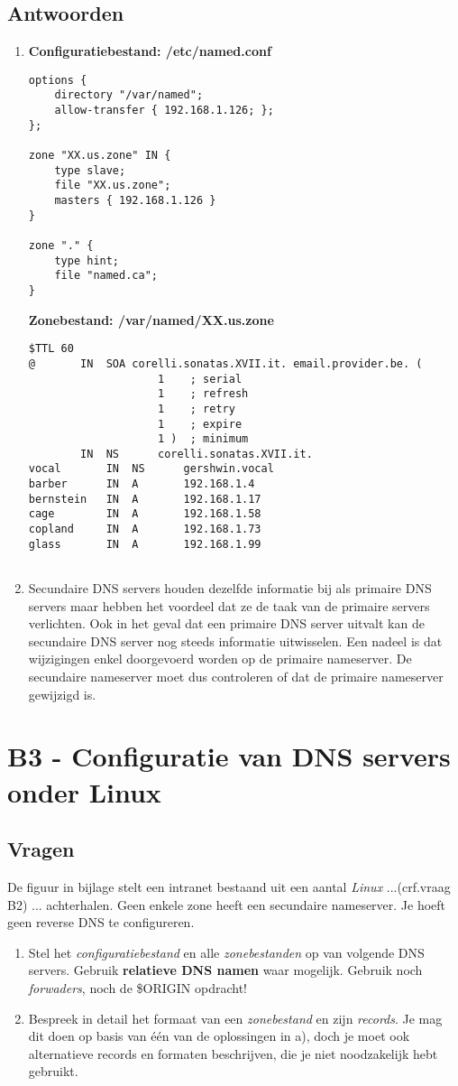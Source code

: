 \documentclass{report}
\begin{document}
\subsection{Antwoorden}
\begin{enumerate}
\item { \textbf{Configuratiebestand: /etc/named.conf}
\begin{lstlisting}
options {
	directory "/var/named";
	allow-transfer { 192.168.1.126; };
};

zone "XX.us.zone" IN {
	type slave;
	file "XX.us.zone";
	masters { 192.168.1.126 }
}

zone "." {
	type hint;
	file "named.ca";
}
\end{lstlisting}

\textbf{Zonebestand: /var/named/XX.us.zone}
\begin{lstlisting}
$TTL 60
@       IN 	SOA	corelli.sonatas.XVII.it. email.provider.be. (
					1    ; serial
					1    ; refresh
					1    ; retry
					1    ; expire
					1 )  ; minimum
		IN 	NS  	corelli.sonatas.XVII.it.
vocal		IN 	NS		gershwin.vocal
barber		IN 	A 		192.168.1.4
bernstein	IN 	A		192.168.1.17
cage		IN	A		192.168.1.58
copland		IN	A		192.168.1.73
glass		IN	A		192.168.1.99


\end{lstlisting}
}

\item { Secundaire DNS servers houden dezelfde informatie bij als primaire DNS servers maar hebben het voordeel dat ze de taak van de primaire servers verlichten. Ook in het geval dat een primaire DNS server uitvalt kan de secundaire DNS server nog steeds informatie uitwisselen. Een nadeel is dat wijzigingen enkel doorgevoerd worden op de primaire nameserver. De secundaire nameserver moet dus controleren of dat de primaire nameserver gewijzigd is.

}
\end{enumerate}

\section{B3 - Configuratie van DNS servers onder Linux}
\subsection{Vragen}
De figuur in bijlage stelt een intranet bestaand uit een aantal \textit{Linux} ...(crf.vraag B2) ... achterhalen. Geen enkele zone heeft een secundaire nameserver. Je hoeft geen reverse DNS te configureren.
\begin{enumerate}
\item Stel het \textit{configuratiebestand} en alle \textit{zonebestanden} op van volgende DNS servers. Gebruik \textbf{relatieve DNS namen} waar mogelijk. Gebruik noch \textit{forwaders}, noch de \$ORIGIN opdracht!
\item Bespreek in detail het formaat van een \textit{zonebestand} en zijn \textit{records}. Je mag dit doen op basis van één van de oplossingen in a), doch je moet ook alternatieve records en formaten beschrijven, die je niet noodzakelijk hebt gebruikt.
\end{enumerate}
\end{document}
